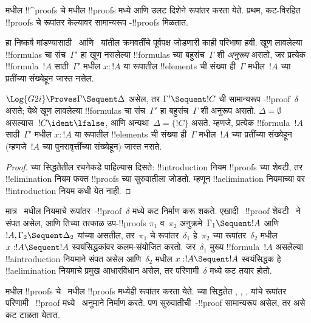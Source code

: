 \documentclass[../../../include/open-logic-section]{subfiles}
\begin{document}


 मधील !!^{proof}s चे  मधील !!{proof}s मध्ये
आणि उलट दिशेने रूपांतर करता येते. प्रथम,
कट-विरहित  !!{proof}s चे रूपांतर केल्यावर
सामान्यरूप -!!{proof}s मिळतात.

हा निष्कर्ष मांडण्यासाठी~ आणि~
यांतील क्रमवर्तींचे पूर्वपक्ष जोडणारी काही परिभाषा हवी.
खूण लावलेल्या !!{formula}s चा संच~$\Gamma'$ हा खूण नसलेल्या
!!{formula}s च्या बहुसंच~$\Gamma$ शी \emph{अनुरूप} असतो,
जर प्रत्येक !!{formula}~$!A$ साठी~$\Gamma'$ मधील
$x : !A$ या रूपातील !!{element}s ची संख्या ही~$\Gamma$
मधील~$!A$ च्या प्रतींच्या संख्येहून जास्त नसेल.

\begin{cor}
$\Log{G2i} \Proves \Gamma \Sequent \Delta$ असेल, तर
$\Gamma' \Sequent !C$ ची सामान्यरूप
-!!{proof}~$\delta$ असते; येथे खूण लावलेल्या
!!{formula}s चा संच~$\Gamma'$ हा बहुसंच~$\Gamma$ शी अनुरूप असतो.
$\Delta=\emptyset$ असल्यास~$!C\ident\lfalse$,
आणि अन्यथा~$\Delta=\{!C\}$ असते.
म्हणजे, प्रत्येक !!{formula}~$!A$ साठी~$\Gamma'$ मधील
$x : !A$ या रूपातील !!{element}s ची संख्या ही~$\Gamma$
मधील~$!A$ च्या प्रतींच्या संख्येहून (म्हणजे~$!A$ च्या
पुनरावृत्तींच्या संख्येहून) जास्त नसते.
\end{cor}

\begin{proof}
 च्या सिद्धतेतील
रचनेकडे पाहिल्यास दिसते: !!{introduction} नियम
!!{proof}s च्या शेवटी, तर !!{elimination} नियम
फक्त !!{proof}s च्या सुरुवातीला जोडतो.
म्हणून !!a{elimination} नियमाच्या वर !!{introduction}
नियम कधी येत नाही.
\end{proof}

मात्र~ मधील
\Cut{} नियमाचे रूपांतर~-!!{proof}~$\delta$ मध्ये
कट निर्माण करू शकते. एखादी~ !!{proof}
शेवटी~\Cut{} ने संपत असेल, आणि तिच्या तत्काळ उप-!!{proof}s
$\pi_1$ व~$\pi_2$ अनुक्रमे~$\Gamma_1 \Sequent !A$
आणि~$!A, \Gamma_2 \Sequent \Delta_2$ यांच्या असतील,
तर~$\pi_1$ चे रूपांतर~$\delta_1$ हे~$\pi_2$ च्या
रूपांतर~$\delta_2$ मधील $x:!A \Sequent !A$
स्वयंसिद्धकांवर कलम-संयोजित करतो. जर~$\delta_1$
मुख्य !!{formula}~$!A$ असलेल्या !!a{introduction}
नियमाने संपत असेल आणि~$\delta_2$ मधील
$x:!A \Sequent !A$ स्वयंसिद्धक हे !!a{elimination}
नियमाचे प्रमुख आधारविधान असेल, तर परिणामी~$\delta$
मध्ये कट तयार होतो.

 मधील !!{proof}s चे~ मधील
!!{proof}s मध्येही रूपांतर करता येते.
 च्या सिद्धतेत
\Elim{\land}, \Elim{\lif}, \Elim{\lnot},
\Elim{\lforall} यांचे रूपांतर परिणामी~
!!{proof} मध्ये~\Cut{} अनुमाने निर्माण करते.
पण सुरुवातीची~-!!{proof} सामान्यरूप असेल,
तर असे कट टाळता येतात.
\end{document}
